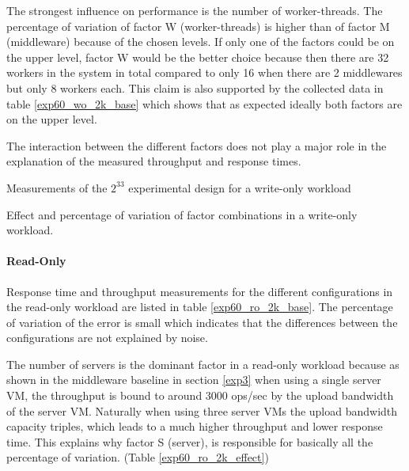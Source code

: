 \documentclass[report.tex]{subfiles}
\begin{document}
The strongest influence on performance is the number of worker-threads. 
The percentage of variation of factor W (worker-threads) is higher than of factor M (middleware) because of the chosen levels. If only one of the factors could be on the upper level, factor W would be the better choice 
because then there are 32 workers in the system in total compared to only 16 when there are 2 middlewares but only 8 workers each. This claim is also supported by the collected data in table \ref{exp60_wo_2k_base} which shows that as expected ideally both factors are on the upper level.

The interaction between the different factors does not play a major role in the explanation of the measured throughput and response times.	

\begin{table}[H]
	\centering
	\small{
		\setlength{\tabcolsep}{3.9pt}
		
		\caption{Measurements of the $2^33$ experimental design for a write-only workload}\label{exp60_wo_2k_base} 
	}
\end{table}


\begin{table}[H]
	\small{
		\centering	
		\setlength{\tabcolsep}{4.1pt}
		\newcommand{\rlft}[0]{\raggedleft\arraybackslash}
		
		\caption{Effect and percentage of variation of factor combinations in a write-only workload.}\label{exp60_wo_2k_effect}
	}
\end{table}


\vspace{-5mm}
\paragraph{Read-Only}

Response time and throughput measurements for the different configurations in the read-only workload are listed in table \ref{exp60_ro_2k_base}. The percentage of variation of the error is small which indicates that the differences between the configurations are not explained by noise. 

The number of servers is the dominant factor in a read-only workload because as shown in the middleware baseline in section \ref{exp3} when using a single server VM, the throughput is bound to around 3000 ops/sec by the upload bandwidth of the server VM. Naturally when using three server VMs the upload bandwidth capacity triples, which leads to a much higher throughput and lower response time. This explains why factor S (server), is responsible for basically all the percentage of variation. (Table \ref{exp60_ro_2k_effect})
\end{document}
